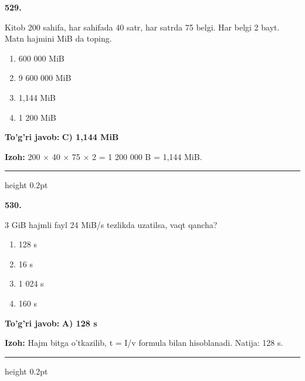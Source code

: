 \documentclass[10pt,a4paper,oneside]{article}
\begin{document}
\noindent\textbf{\color{ink}529.}
\par
Kitob 200 sahifa, har sahifada 40 satr, har satrda 75 belgi. Har belgi 2 bayt. Matn hajmini MiB da toping.
\begin{enumerate}[label=\Alph*),leftmargin=9mm]
\item 600 000 MiB
\item 9 600 000 MiB
\item 1,144 MiB
\item 1 200 MiB
\end{enumerate}
\begin{tcolorbox}[enhanced,breakable,colback=teal!4,colframe=teal!50!black,boxrule=0.5pt,arc=1.1mm,left=3mm,right=3mm,top=1.7mm,bottom=1.7mm,before skip=2mm,after skip=2mm]
\textbf{\color{teal}To'g'ri javob:} \textbf{C) 1,144 MiB}
\par\smallskip
\textbf{Izoh:} 200 \ensuremath{\times} 40 \ensuremath{\times} 75 \ensuremath{\times} 2 = 1 200 000 B = 1,144 MiB.
\end{tcolorbox}
\vspace{2mm}\hrule height 0.2pt \vspace{3mm}

\noindent\textbf{\color{ink}530.}
\par
3 GiB hajmli fayl 24 MiB/s tezlikda uzatilsa, vaqt qancha?
\begin{enumerate}[label=\Alph*),leftmargin=9mm]
\item 128 s
\item 16 s
\item 1 024 s
\item 160 s
\end{enumerate}
\begin{tcolorbox}[enhanced,breakable,colback=teal!4,colframe=teal!50!black,boxrule=0.5pt,arc=1.1mm,left=3mm,right=3mm,top=1.7mm,bottom=1.7mm,before skip=2mm,after skip=2mm]
\textbf{\color{teal}To'g'ri javob:} \textbf{A) 128 s}
\par\smallskip
\textbf{Izoh:} Hajm bitga o'tkazilib, t = I/v formula bilan hisoblanadi. Natija: 128 s.
\end{tcolorbox}
\vspace{2mm}\hrule height 0.2pt \vspace{3mm}
\end{document}
